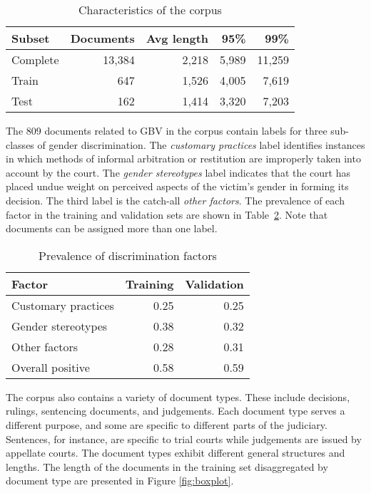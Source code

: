 \documentclass[twocolumn,10pt]{wmrDoc}
\begin{document}
\begin{table}
 \caption{Characteristics of the corpus}
  \centering
  \begin{tabular}{lrrrr}
    \toprule
    Subset   & Documents  & Avg length & 95\% & 99\%\\
    \midrule
    Complete & 13,384  & 2,218 & 5,989 & 11,259     \\
    Train    & 647  & 1,526 & 4,005 & 7,619      \\
    Test     & 162  & 1,414 & 3,320 & 7,203      \\
    \bottomrule
  \end{tabular}
  \label{tab:corpus}
\end{table}

The 809 documents related to GBV in the corpus contain labels for three sub-classes of gender discrimination.  The \emph{customary practices} label identifies instances in which methods of informal arbitration or restitution are improperly taken into account by the court.  The \emph{gender stereotypes} label indicates that the court has placed undue weight on perceived aspects of the victim's gender in forming its decision.  The third label is the catch-all \emph{other factors}.  The prevalence of each factor in the training and validation sets are shown in Table~\ref{tab:disc_type}.  Note that documents can be assigned more than one label.

\begin{table}
 \caption{Prevalence of discrimination factors}
  \centering
  \begin{tabular}{lrr}
    \toprule
    Factor   & Training  & Validation \\
    \midrule
    Customary practices & 0.25  & 0.25 \\
    Gender stereotypes  & 0.38  & 0.32 \\
    Other factors       & 0.28  & 0.31 \\
    \midrule
    Overall positive    & 0.58  & 0.59 \\
    \bottomrule
  \end{tabular}
  \label{tab:disc_type}
\end{table}

The corpus also contains a variety of document types.  These include decisions, rulings, sentencing documents, and judgements.  Each document type serves a different purpose, and some are specific to different parts of the judiciary.  Sentences, for instance, are specific to trial courts while judgements are issued by appellate courts. The document types exhibit different general structures and lengths.  The length of the documents in the training set disaggregated by document type are presented in Figure \ref{fig:boxplot}.
\end{document}
